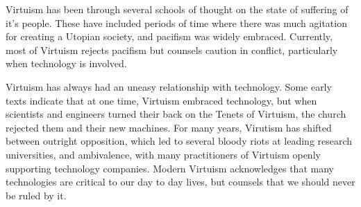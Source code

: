 \documentclass[blue]{guildcamp1}
\begin{document}
Virtuism has been through several schools of thought on the state of suffering of it's people. These have included periods of time where there was much agitation for creating a Utopian society, and pacifism was widely embraced. Currently, most of Virtuism rejects pacifism but counsels caution in conflict, particularly when technology is involved. 

Virtuism has always had an uneasy relationship with technology. Some early texts indicate that at one time, Virtuism embraced technology, but when scientists and engineers turned their back on the Tenets of Virtuism, the church rejected them and their new machines. For many years, Virutism has shifted between outright opposition, which led to several bloody riots at leading research universities, and ambivalence, with many practitioners of Virtuism openly supporting technology companies. Modern Virtuism acknowledges that many technologies are critical to our day to day lives, but counsels that we should never be ruled by it.
\end{document}
